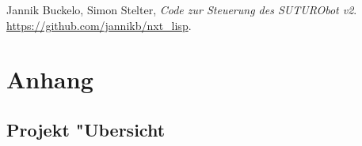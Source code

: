 \documentclass[8pt]{article}
\begin{document}
\begin{thebibliography}{9}

  Jannik Buckelo, Simon Stelter,
  \emph{Code zur Steuerung des SUTURObot v2}.
  \url{https://github.com/jannikb/nxt\_lisp}.

\end{thebibliography}

\section*{Anhang}
\subsection*{Projekt "Ubersicht}

\end{document}
